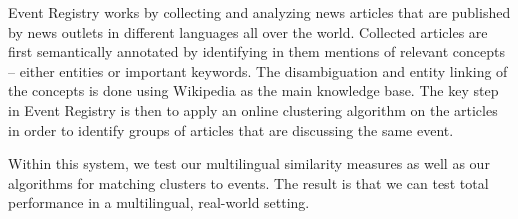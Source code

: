 \documentclass[twoside,11pt]{article}
\begin{document}
Event Registry works by collecting and analyzing news articles that are published by news outlets in different languages all over the world. Collected articles are first semantically annotated by identifying in them mentions of relevant concepts -- either entities or important keywords. The disambiguation and entity linking of the concepts is done using Wikipedia as the main knowledge base.
   The key step in Event Registry is then to apply an online clustering algorithm on the articles in order to identify groups of articles that are discussing the same event.

   Within this system, we test our multilingual similarity measures as well as our algorithms for matching clusters to events.  The result is that we can test total performance in a multilingual, real-world setting.
\end{document}
